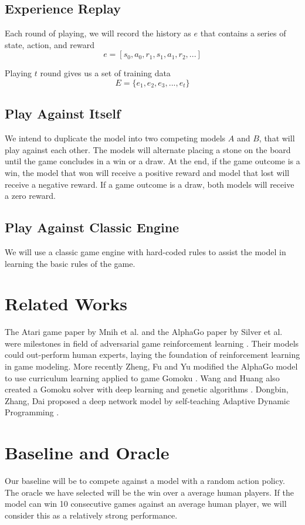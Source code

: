 \documentclass[conference]{IEEEtran}
\begin{document}
\subsection{Experience Replay}
Each round of playing, we will record the history as $e$ that contains a series of state, action, and reward
$$e = [s_0, a_0, r_1, s_1, a_1, r_2, ...]$$

Playing $t$ round gives us a set of training data
$$E = \{e_1, e_2, e_3, ..., e_t\}$$

\subsection{Play Against Itself}
We intend to duplicate the model into two competing models $A$ and $B$, that will play against each other. The models will alternate placing a stone on the board until the game concludes in a win or a draw. At the end, if the game outcome is a win, the model that won will receive a positive reward and model that lost will receive a negative reward. If a game outcome is a draw, both models will receive a zero reward.

\subsection{Play Against Classic Engine}
We will use a classic game engine with hard-coded rules to assist the model in learning the basic rules of the game.

\section{Related Works}\label{AA}
The Atari game paper by Mnih et al. and the AlphaGo paper by Silver et al. were milestones in field of adversarial game reinforcement learning \cite{b1, b2}. Their models could out-perform human experts, laying the foundation of reinforcement learning in game modeling. More recently Zheng, Fu and Yu modified the AlphaGo model to use curriculum learning applied to game Gomoku \cite{b3}. Wang and Huang also created a Gomoku solver with deep learning and genetic algorithms \cite{b5}. Dongbin, Zhang, Dai proposed a deep network model by self-teaching Adaptive Dynamic Programming \cite{b6}.

\section{Baseline and Oracle}
Our baseline will be to compete against a model with a random action policy. The oracle we have selected will be the win over a average human players. If the model can win 10 consecutive games against an average human player, we will consider this as a relatively strong performance.
\end{document}
